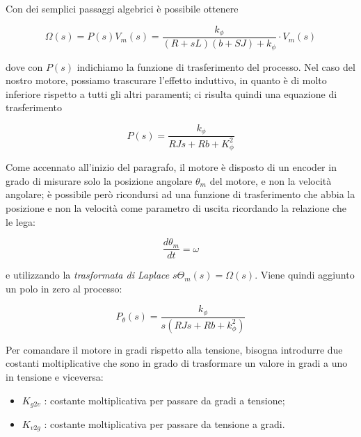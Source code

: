 		\noindent Con dei semplici passaggi algebrici è possibile ottenere
	
		\begin{equation}
			\Omega(s) = P(s)V_m(s) = \frac{k_{\phi}}{(R+sL)(b+SJ)+k_{\phi}}\cdot V_m(s)
			\label{eq:funzioneTrasferimento}
		\end{equation}
	
		\noindent dove con $P(s)$ indichiamo la funzione di trasferimento del processo. Nel caso del nostro motore, possiamo trascurare l'effetto induttivo, in quanto è di molto inferiore rispetto a tutti gli altri paramenti; ci risulta quindi una equazione di trasferimento
	
		\begin{equation}
			P(s) = \frac{k_{\phi}}{RJs + Rb +K_{\phi}^2}
			\label{eq:funzioneTrasferimentoSemplificata}
		\end{equation}
	
		\noindent Come accennato all'inizio del paragrafo, il motore è disposto di un encoder in grado di misurare solo la posizione angolare $\theta_m$ del motore, e non la velocità angolare; è possibile però ricondursi ad una funzione di trasferimento che abbia la posizione e non la velocità come parametro di uscita ricordando la relazione che le lega: 
	
		\begin{equation*}
			\frac{d\theta_m}{dt} = \omega
			\label{eq:posizioneVelocità}
		\end{equation*}
	
		\noindent e utilizzando la \textit{trasformata di Laplace} $s\Theta_m(s)=\Omega(s)$. Viene quindi aggiunto un polo in zero al processo:
	
		\begin{equation}
			P_{\theta}(s) = \frac{k_{\phi}}{s(RJs + Rb + k_{\phi}^2)}
			\label{eq:funzioneTrasferimentoMotoriduttore}
		\end{equation}
	
		\noindent Per comandare il motore in gradi rispetto alla tensione, bisogna introdurre due costanti moltiplicative che sono in grado di trasformare un valore in gradi a uno in tensione e viceversa:
	
		\begin{itemize}
			\item $K_{g2v}$ : costante moltiplicativa per passare da gradi a tensione;
			\item $K_{v2g}$ : costante moltiplicativa per passare da tensione a gradi.
			\label{item:costantiK} 
		\end{itemize}
	

